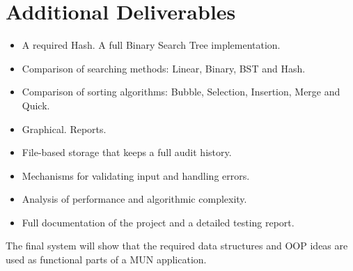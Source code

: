 \documentclass[11pt,a4paper]{article}
\newcommand{\sectiontitle}[1]{\vspace{3pt}\section*{#1}\vspace{2pt}}
\begin{document}
\sectiontitle{Additional Deliverables}

\begin{itemize}[leftmargin=1.3em,itemsep=4pt]
    \item A required Hash. A full Binary Search Tree implementation.
    \item Comparison of searching methods: Linear, Binary, BST and Hash.
    \item Comparison of sorting algorithms: Bubble, Selection, Insertion, Merge and Quick.
    \item Graphical. Reports.
    \item File-based storage that keeps a full audit history.
    \item Mechanisms for validating input and handling errors.
    \item Analysis of performance and algorithmic complexity.
    \item Full documentation of the project and a detailed testing report.
\end{itemize}

The final system will show that the required data structures and OOP ideas are used as functional
parts of a MUN application.
\end{document}
